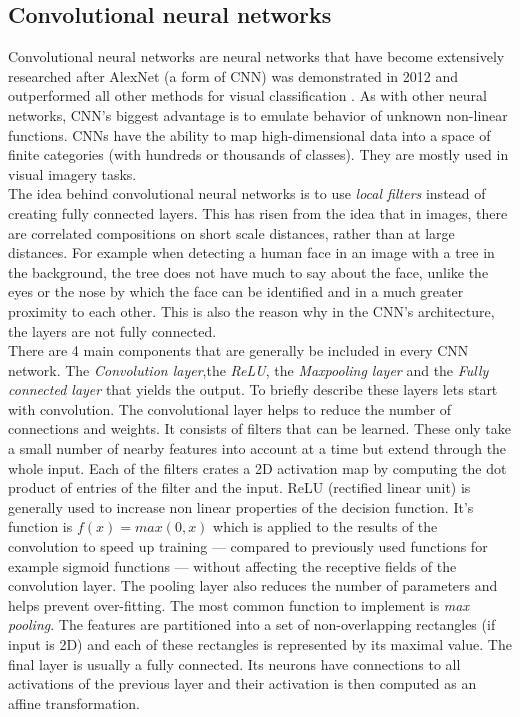 \subsection{Convolutional neural networks}
Convolutional neural networks are neural networks that have become extensively researched after AlexNet (a form of CNN) was demonstrated in 2012 and outperformed all other methods for visual classification \cite{Krizhevsky:2012:ICD:2999134.2999257}. As with other neural networks, CNN's biggest advantage is to emulate behavior of unknown non-linear functions. CNNs have the ability to map high-dimensional data into a space of finite categories (with hundreds or thousands of classes). They are mostly used in visual imagery tasks. \\
The idea behind convolutional neural networks is to use \textit{local filters} instead of creating fully connected layers. This has risen from the idea that in images, there are correlated compositions on short scale distances, rather than at large distances. For example when detecting a human face in an image with a tree in the background, the tree does not have much to say about the face, unlike the eyes or the nose by which the face can be identified and in a much greater proximity to each other. This is also the reason why in the CNN's architecture, the layers are not fully connected. \\
There are 4 main components that are generally be included in every CNN network. The \textit{Convolution layer},the \textit{ReLU}, the \textit{Maxpooling layer} and the \textit{Fully connected layer} that yields the output. To briefly describe these layers lets start with convolution. The convolutional layer helps to reduce the number of connections and weights. It consists of filters that can be learned. These only take a small number of nearby features into account at a time but extend through the whole input. Each of the filters crates a 2D activation map by computing the dot product of entries of the filter and the input. ReLU (rectified linear unit) is generally used to increase non linear properties of the decision function. It's function is $ f(x) = max(0,x) $ which is applied to the results of the convolution to speed up training --- compared to previously used functions for example sigmoid functions --- without affecting the receptive fields of the convolution layer. The pooling layer also reduces the number of parameters and helps prevent over-fitting. The most common function to implement is \textit{max pooling}. The features are partitioned into a set of non-overlapping rectangles (if input is 2D) and each of these rectangles  is represented by its maximal value. 
The final layer is usually a fully connected. Its neurons have connections to all activations of the previous layer and their activation is then computed as an affine transformation. 

